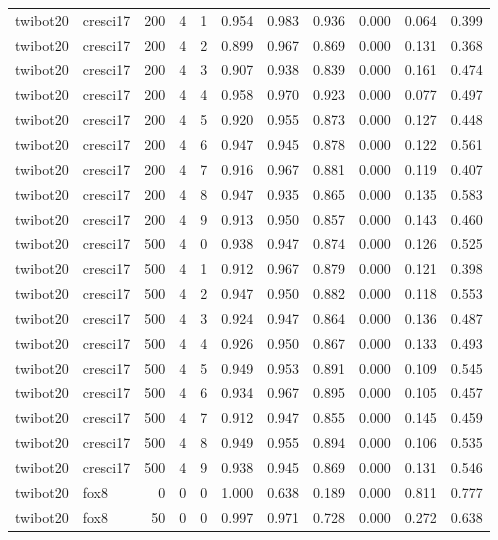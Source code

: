 \begin{tabular}{llrrrrrrrrr}
twibot20 & cresci17 & 200 & 4 & 1 & 0.954 & 0.983 & 0.936 & 0.000 & 0.064 & 0.399 \\
twibot20 & cresci17 & 200 & 4 & 2 & 0.899 & 0.967 & 0.869 & 0.000 & 0.131 & 0.368 \\
twibot20 & cresci17 & 200 & 4 & 3 & 0.907 & 0.938 & 0.839 & 0.000 & 0.161 & 0.474 \\
twibot20 & cresci17 & 200 & 4 & 4 & 0.958 & 0.970 & 0.923 & 0.000 & 0.077 & 0.497 \\
twibot20 & cresci17 & 200 & 4 & 5 & 0.920 & 0.955 & 0.873 & 0.000 & 0.127 & 0.448 \\
twibot20 & cresci17 & 200 & 4 & 6 & 0.947 & 0.945 & 0.878 & 0.000 & 0.122 & 0.561 \\
twibot20 & cresci17 & 200 & 4 & 7 & 0.916 & 0.967 & 0.881 & 0.000 & 0.119 & 0.407 \\
twibot20 & cresci17 & 200 & 4 & 8 & 0.947 & 0.935 & 0.865 & 0.000 & 0.135 & 0.583 \\
twibot20 & cresci17 & 200 & 4 & 9 & 0.913 & 0.950 & 0.857 & 0.000 & 0.143 & 0.460 \\
twibot20 & cresci17 & 500 & 4 & 0 & 0.938 & 0.947 & 0.874 & 0.000 & 0.126 & 0.525 \\
twibot20 & cresci17 & 500 & 4 & 1 & 0.912 & 0.967 & 0.879 & 0.000 & 0.121 & 0.398 \\
twibot20 & cresci17 & 500 & 4 & 2 & 0.947 & 0.950 & 0.882 & 0.000 & 0.118 & 0.553 \\
twibot20 & cresci17 & 500 & 4 & 3 & 0.924 & 0.947 & 0.864 & 0.000 & 0.136 & 0.487 \\
twibot20 & cresci17 & 500 & 4 & 4 & 0.926 & 0.950 & 0.867 & 0.000 & 0.133 & 0.493 \\
twibot20 & cresci17 & 500 & 4 & 5 & 0.949 & 0.953 & 0.891 & 0.000 & 0.109 & 0.545 \\
twibot20 & cresci17 & 500 & 4 & 6 & 0.934 & 0.967 & 0.895 & 0.000 & 0.105 & 0.457 \\
twibot20 & cresci17 & 500 & 4 & 7 & 0.912 & 0.947 & 0.855 & 0.000 & 0.145 & 0.459 \\
twibot20 & cresci17 & 500 & 4 & 8 & 0.949 & 0.955 & 0.894 & 0.000 & 0.106 & 0.535 \\
twibot20 & cresci17 & 500 & 4 & 9 & 0.938 & 0.945 & 0.869 & 0.000 & 0.131 & 0.546 \\
twibot20 & fox8 & 0 & 0 & 0 & 1.000 & 0.638 & 0.189 & 0.000 & 0.811 & 0.777 \\
twibot20 & fox8 & 50 & 0 & 0 & 0.997 & 0.971 & 0.728 & 0.000 & 0.272 & 0.638 \\

\end{tabular}
